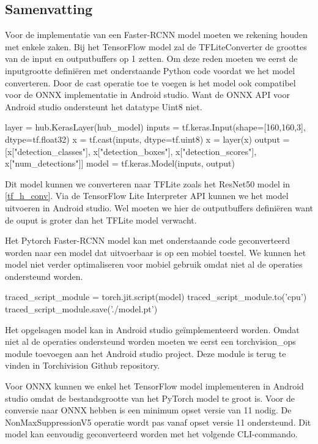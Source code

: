 \subsection{Samenvatting}
Voor de implementatie van een Faster-RCNN model moeten we rekening houden met enkele zaken.
Bij het TensorFlow model zal de TFLiteConverter de groottes van de input en outputbuffers op 1 zetten.
Om deze reden moeten we eerst de inputgrootte defini\"eren met onderstaande Python code voordat we het model converteren.
Door de cast operatie toe te voegen is het model ook compatibel voor de ONNX implementatie in Android studio.
Want de ONNX API voor Android studio ondersteunt het datatype Uint8 niet.
\newpage
\begin{python}
layer = hub.KerasLayer(hub_model) 
inputs = tf.keras.Input(shape=[160,160,3], dtype=tf.float32)
x = tf.cast(inputs, dtype=tf.uint8)
x = layer(x) 
output = [x["detection_classes"], x["detection_boxes"], x["detection_scores"], x["num_detections"]]
model = tf.keras.Model(inputs, output) 
\end{python}

Dit model kunnen we converteren naar TFLite zoals het ResNet50 model in \ref{tf_h_conv}.
Via de TensorFlow Lite Interpreter API kunnen we het model uitvoeren in Android studio.
Wel moeten we hier de outputbuffers defini\"eren want de ouput is groter dan het TFLite model verwacht.

Het Pytorch Faster-RCNN model kan met onderstaande code geconverteerd worden naar een model dat uitvoerbaar is op een mobiel toestel.
We kunnen het model niet verder optimaliseren voor mobiel gebruik omdat niet al de operaties ondersteund worden.

\begin{python}
traced_script_module = torch.jit.script(model)
traced_script_module.to('cpu') 
traced_script_module.save('./model.pt') 
\end{python}

Het opgelsagen model kan in Android studio ge\"implementeerd worden.
Omdat niet al de operaties ondersteund worden moeten we eerst een torchvision\_ops module toevoegen aan het Android studio project.
Deze module is terug te vinden in Torchivision Github repository.

Voor ONNX kunnen we enkel het TensorFlow model implementeren in Android studio omdat de bestandsgrootte van het PyTorch model te groot is.
Voor de conversie naar ONNX hebben is een minimum opset versie van 11 nodig.
De NonMaxSuppressionV5 operatie wordt pas vanaf opset versie 11 ondersteund.
Dit model kan eenvoudig geconverteerd worden met het volgende CLI-commando.

